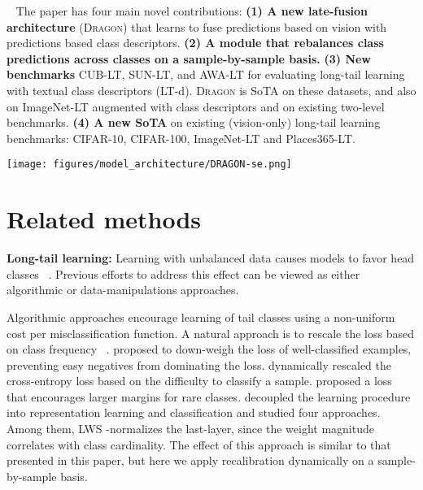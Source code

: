 \documentclass[10pt,twocolumn,letterpaper]{article}
\newcommand{\DRAGON}{\textsc{Dragon}}
\begin{document}
~\newline
\noindent The paper has four main novel contributions: 
\noindent\newline\textbf{(1) A new late-fusion architecture} (\DRAGON{}) that learns to fuse predictions based on vision with predictions based class descriptors. 
\noindent\newline\textbf{(2) A module that rebalances class predictions across classes on a sample-by-sample basis.}
\noindent\newline\textbf{(3) New benchmarks }CUB-LT, SUN-LT, and AWA-LT for evaluating long-tail learning with textual class descriptors (LT-d).
    \DRAGON{} is SoTA on these datasets, and also on ImageNet-LT augmented with class descriptors and on existing two-level benchmarks.
\noindent\newline\textbf{(4) A new SoTA} on existing (vision-only) long-tail learning benchmarks: CIFAR-10, CIFAR-100, ImageNet-LT and Places365-LT. 


\begin{figure*}[t]
    \centering
    \texttt{[image: figures/model\_architecture/DRAGON-se.png]}
    \caption{The \DRAGON{} architecture for long-tail learning with class-descriptors. The visual-expert and attribute-expert each outputs a prediction vector fed to a fusion module. The fusion module combines expert predictions and debias them. Blue, network components. Yellow, input to the fusion module. Green, the outputs of the fusion module. }
    \label{fig:DRAGON architecture}
\end{figure*}

\section{Related methods}
\label{sec:related}

\noindent\textbf{Long-tail learning:}
Learning with unbalanced data causes models to favor head classes ~\cite{buda2017systematic}. Previous efforts to address this effect can be viewed as either algorithmic or data-manipulations approaches. 

Algorithmic approaches encourage learning of tail classes using a non-uniform cost per misclassification function. A natural approach is to rescale the loss based on class frequency ~\cite{He_2009_IEEE}. \cite{Lin2017FocalLF} proposed to down-weigh the loss of well-classified examples, preventing easy negatives from dominating the loss. \cite{Ryou_2019_ICCV}  dynamically rescaled the cross-entropy loss based on the difficulty to classify a sample. \cite{cao2019learning} proposed a loss that encourages larger margins for rare classes.
\cite{Kang2019DecouplingRA} decoupled the learning procedure into representation learning and classification and studied four approaches. Among them, LWS -normalizes the last-layer, since the weight magnitude correlates with class cardinality. The effect of this approach is similar to that presented in this paper, but here we apply recalibration dynamically on a sample-by-sample basis.
\end{document}
